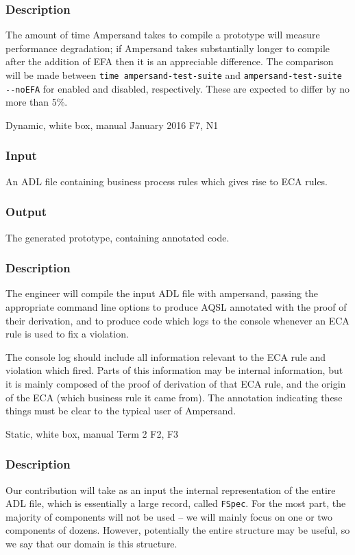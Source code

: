 \documentclass[12pt]{report}
\begin{document}
\vspace{-12pt}\subsubsection*{Description}
The amount of time Ampersand takes to compile a prototype will measure
performance degradation; if Ampersand takes substantially longer to compile
after the addition of EFA then it is an appreciable difference.  The comparison
will be made between \verb|time ampersand-test-suite| and
\verb|ampersand-test-suite --noEFA| for enabled and disabled,
respectively. These are expected to differ by no more than 5\%. 



{Dynamic, white box, manual}
{January 2016}
{F7, N1}
\vspace{-12pt}\subsubsection*{Input}
An ADL file containing business process rules which gives rise to ECA rules. 

\vspace{-12pt}\subsubsection*{Output} 
The generated prototype, containing annotated code.

\vspace{-12pt}\subsubsection*{Description}
The engineer will compile the input ADL file with ampersand, passing the
appropriate command line options to produce AQSL annotated with the proof of
their derivation, and to produce code which logs to the console whenever an ECA
rule is used to fix a violation.

The console log should include all information relevant to the ECA rule and
violation which fired. Parts of this information may be internal information,
but it is mainly composed of the proof of derivation of that ECA rule, and the
origin of the ECA (which business rule it came from). The annotation indicating
these things must be clear to the typical user of Ampersand.

{Static, white box, manual}
{Term 2}
{F2, F3}
\vspace{-12pt}\subsubsection*{Description}
Our contribution will take as an input the internal representation of the entire
ADL file, which is essentially a large record, called \verb|FSpec|. For the most
part, the majority of components will not be used -- we will mainly focus on one
or two components of dozens. However, potentially the entire structure may be
useful, so we say that our domain is this structure.
\end{document}
